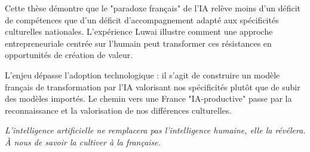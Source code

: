 Cette thèse démontre que le "paradoxe français" de l'IA relève moins d'un déficit de compétences que d'un déficit d'accompagnement adapté aux spécificités culturelles nationales. L'expérience Luwai illustre comment une approche entrepreneuriale centrée sur l'humain peut transformer ces résistances en opportunités de création de valeur.

L'enjeu dépasse l'adoption technologique : il s'agit de construire un modèle français de transformation par l'IA valorisant nos spécificités plutôt que de subir des modèles importés. Le chemin vers une France "IA-productive" passe par la reconnaissance et la valorisation de nos différences culturelles.

\emph{L'intelligence artificielle ne remplacera pas l'intelligence humaine, elle la révélera. À nous de savoir la cultiver à la française.}
